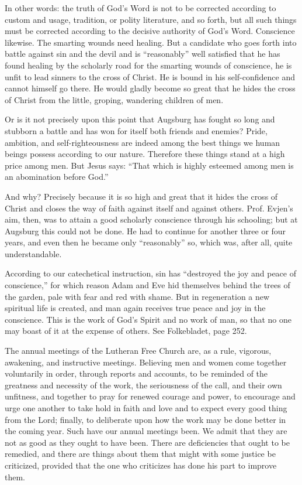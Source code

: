 In other words: the truth of God’s Word is not to be corrected according to custom and usage, tradition, or polity literature, and so forth, but all such things must be corrected according to the decisive authority of God’s Word. Conscience likewise. The smarting wounds need healing. But a candidate who goes forth into battle against sin and the devil and is “reasonably” well satisfied that he has found healing by the scholarly road for the smarting wounds of conscience, he is unfit to lead sinners to the cross of Christ. He is bound in his self-confidence and cannot himself go there. He would gladly become so great that he hides the cross of Christ from the little, groping, wandering children of men.

Or is it not precisely upon this point that Augsburg has fought so long and stubborn a battle and has won for itself both friends and enemies? Pride, ambition, and self-righteousness are indeed among the best things we human beings possess according to our nature. Therefore these things stand at a high price among men. But Jesus says: “That which is highly esteemed among men is an abomination before God.”

And why? Precisely because it is so high and great that it hides the cross of Christ and closes the way of faith against itself and against others. Prof. Evjen’s aim, then, was to attain a good scholarly conscience through his schooling; but at Augsburg this could not be done. He had to continue for another three or four years, and even then he became only “reasonably” so, which was, after all, quite understandable.

According to our catechetical instruction, sin has “destroyed the joy and peace of conscience,” for which reason Adam and Eve hid themselves behind the trees of the garden, pale with fear and red with shame. But in regeneration a new spiritual life is created, and man again receives true peace and joy in the conscience. This is the work of God’s Spirit and no work of man, so that no one may boast of it at the expense of others. See Folkebladet, page 252.

The annual meetings of the Lutheran Free Church are, as a rule, vigorous, awakening, and instructive meetings. Believing men and women come together voluntarily in order, through reports and accounts, to be reminded of the greatness and necessity of the work, the seriousness of the call, and their own unfitness, and together to pray for renewed courage and power, to encourage and urge one another to take hold in faith and love and to expect every good thing from the Lord; finally, to deliberate upon how the work may be done better in the coming year. Such have our annual meetings been. We admit that they are not as good as they ought to have been. There are deficiencies that ought to be remedied, and there are things about them that might with some justice be criticized, provided that the one who criticizes has done his part to improve them.

